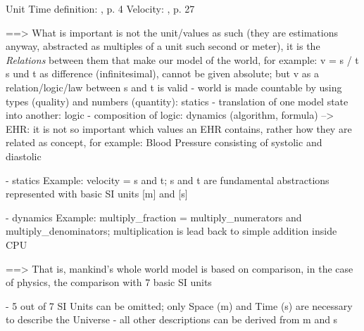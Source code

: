 Unit Time definition: \cite{platt}, p. 4
Velocity: \cite{platt}, p. 27

==> What is important is not the unit/values as such (they are estimations anyway,
abstracted as multiples of a unit such second or meter), it is the \emph{Relations}
between them that make our model of the world, for example: v = s / t
s und t as difference (infinitesimal), cannot be given absolute;
but v as a relation/logic/law between s and t is valid
- world is made countable by using types (quality) and numbers (quantity): statics
- translation of one model state into another: logic
- composition of logic: dynamics (algorithm, formula)
--> EHR: it is not so important which values an EHR contains, rather how they are
related as concept, for example: Blood Pressure consisting of systolic and diastolic

- statics Example: velocity = s and t; s and t are fundamental abstractions
represented with basic SI units [m] and [s]

- dynamics Example: multiply_fraction = multiply_numerators and multiply_denominators;
multiplication is lead back to simple addition inside CPU

==> That is, mankind's whole world model is based on comparison, in the case of
physics, the comparison with 7 basic SI units

- 5 out of 7 SI Units can be omitted; only Space (m) and Time (s) are necessary
to describe the Universe
- all other descriptions can be derived from m and s
